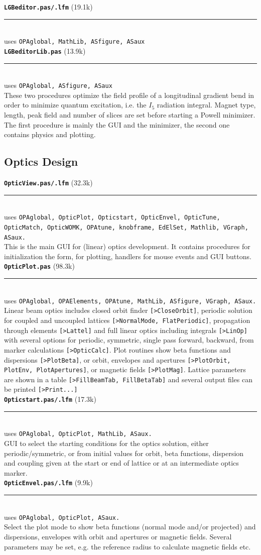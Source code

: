 \documentclass[12pt]{article}
\newcommand\code[1]{{\tt [#1]}}
\newcommand\opamodule[3]{{\bf \tt #1} #2\\  \rule[3pt]{\textwidth}{0.2pt} \\ {\scriptsize uses \tt  #3}\\[1ex]}
\begin{document}
\opamodule{LGBeditor.pas/.lfm}{(19.1k)}{OPAglobal,  MathLib, ASfigure, ASaux}
\opamodule{LGBeditorLib.pas}{(13.9k)}{OPAglobal, ASfigure, ASaux}
These two procedures optimize the field profile of a longitudinal gradient bend in order to minimize quantum excitation, i.e. the $I_5$ radiation integral. Magnet type, length, peak field and number of slices are set before starting a Powell minimizer. The first procedure is mainly the GUI and the minimizer, the second one contains physics and plotting.

\subsection{Optics Design}

\opamodule{OpticView.pas/.lfm}{(32.3k)}{OPAglobal, OpticPlot, Opticstart, OpticEnvel, OpticTune, OpticMatch, OpticWOMK, OPAtune, knobframe, EdElSet, Mathlib, VGraph, ASaux.}
This is the main GUI for (linear) optics development. It contains procedures for initialization the form, for plotting, handlers for mouse events and GUI buttons.\\

\opamodule{OpticPlot.pas}{(98.3k)}{OPAglobal, OPAElements, OPAtune, MathLib, ASfigure, VGraph, ASaux.}
Linear beam optics includes closed orbit finder \code{>CloseOrbit}, periodic solution for coupled and uncoupled lattices \code{>NormalMode, FlatPeriodic}, propagation through elements \code{>Lattel} and full linear optics including integrals \code{>LinOp} with several options for periodic, symmetric, single pass forward, backward, from marker calculations \code{>OpticCalc}. Plot routines show beta functions and dispersions \code{>PlotBeta}, or orbit, envelopes and apertures \code{>PlotOrbit, PlotEnv, PlotApertures}, or magnetic fields \code{>PlotMag}. Lattice parameters are shown in a table \code{>FillBeamTab, FillBetaTab} and several output files can be printed \code{>Print...}\\

\opamodule{Opticstart.pas/.lfm}{(17.3k)}{OPAglobal,  OpticPlot, MathLib, ASaux.}
GUI to select the starting conditions for the optics solution, either periodic/symmetric, or from initial values for orbit, beta functions, dispersion and coupling given at the start or end of lattice or at an intermediate optics marker.\\

\opamodule{OpticEnvel.pas/.lfm}{(9.9k)}{OPAglobal,  OpticPlot, ASaux.}
Select the plot mode to show beta functions (normal mode and/or projected) and dispersions, envelopes with orbit and apertures or magnetic fields. Several parameters may be set, e.g. the reference radius to calculate magnetic fields etc.\\
\end{document}
